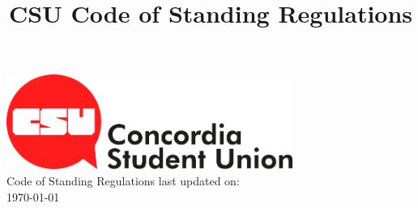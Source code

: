 \documentclass[oneside]{book}
\title{CSU Code of Standing Regulations}
\begin{document}
\begin{titlepage}

\begin{center}

\includegraphics[width=0.7\textwidth]{./csulogo} \\
\vfill
{\Huge Code of Standing Regulations}
\vfill
{\LARGE last updated on: \\ \today}
\end{center}

\end{titlepage}

\tableofcontents{}

\pagebreak{}
\setcounter{secnumdepth}{-2}
\end{document}
